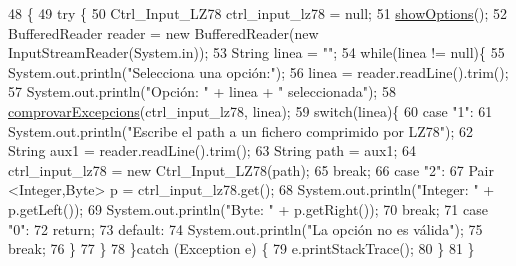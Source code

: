 \begin{DoxyCode}
48                                            \{
49     \textcolor{keywordflow}{try} \{
50         Ctrl\_Input\_LZ78 ctrl\_input\_lz78 = null;
51         \hyperlink{classpersistencia_1_1input_1_1Driver____Ctrl__Input__LZ78_af3c2d5d864dec2d98d3d57c474f9c2b4}{showOptions}();
52         BufferedReader reader = \textcolor{keyword}{new} BufferedReader(\textcolor{keyword}{new} InputStreamReader(System.in));
53         String linea = \textcolor{stringliteral}{""};
54         \textcolor{keywordflow}{while}(linea != null)\{
55             System.out.println(\textcolor{stringliteral}{"Selecciona una opción:"});
56             linea = reader.readLine().trim();
57             System.out.println(\textcolor{stringliteral}{"Opción: "} + linea + \textcolor{stringliteral}{" seleccionada"});
58             \hyperlink{classpersistencia_1_1input_1_1Driver____Ctrl__Input__LZ78_a285493e74dff1f6b2520f010f75b850c}{comprovarExcepcions}(ctrl\_input\_lz78, linea);
59             \textcolor{keywordflow}{switch}(linea)\{
60                 \textcolor{keywordflow}{case} \textcolor{stringliteral}{"1"}:
61                     System.out.println(\textcolor{stringliteral}{"Escribe el path a un fichero comprimido por LZ78"});
62                     String aux1 = reader.readLine().trim();
63                     String path = aux1;
64                     ctrl\_input\_lz78 = \textcolor{keyword}{new} Ctrl\_Input\_LZ78(path);
65                 \textcolor{keywordflow}{break};
66                 \textcolor{keywordflow}{case} \textcolor{stringliteral}{"2"}:
67                     Pair <Integer,Byte> p = ctrl\_input\_lz78.get();
68                     System.out.println(\textcolor{stringliteral}{"Integer: "} + p.getLeft());
69                     System.out.println(\textcolor{stringliteral}{"Byte: "} + p.getRight());
70                 \textcolor{keywordflow}{break};
71                 \textcolor{keywordflow}{case} \textcolor{stringliteral}{"0"}:
72                     \textcolor{keywordflow}{return};
73                 \textcolor{keywordflow}{default}:
74                     System.out.println(\textcolor{stringliteral}{"La opción no es válida"});
75                 \textcolor{keywordflow}{break};
76             \}
77         \}
78     \}\textcolor{keywordflow}{catch} (Exception e) \{
79         e.printStackTrace();
80     \}
81     \}
\end{DoxyCode}
\mbox{\label{classpersistencia_1_1input_1_1Driver____Ctrl__Input__LZ78_af3c2d5d864dec2d98d3d57c474f9c2b4}} 
